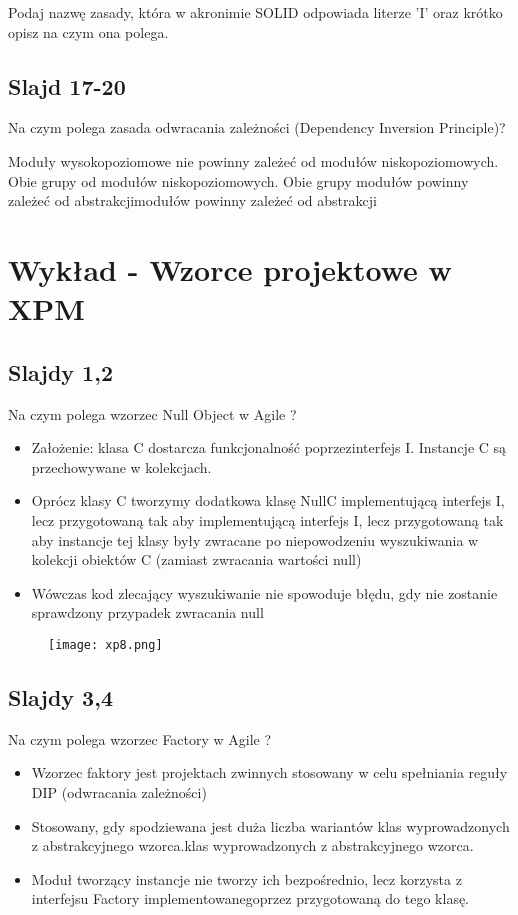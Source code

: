 \documentclass[a4paper,15pt]{article}
\newcommand{\question}[2]{
    \begin{tcolorbox}[colback=mRed!5!white,colframe=mRed,title={Kolokwium 2018 #1}]
        #2
    \end{tcolorbox}
}
\begin{document}
\question{}{
 Podaj nazwę zasady, która w akronimie SOLID odpowiada literze 'I' oraz krótko opisz na czym ona polega. 
}

\subsection{Slajd 17-20}
\begin{framed}
Na czym polega zasada odwracania zależności (Dependency Inversion Principle)?
\end{framed}
Moduły wysokopoziomowe nie powinny zależeć od modułów niskopoziomowych. Obie grupy od modułów niskopoziomowych. Obie grupy modułów powinny zależeć od abstrakcjimodułów powinny zależeć od abstrakcji

\section{Wykład - Wzorce projektowe w XPM}

\subsection{Slajdy 1,2}
\begin{framed}
Na czym polega wzorzec Null Object w Agile ?
\end{framed}
\begin{itemize}
\item Założenie: klasa C dostarcza funkcjonalność poprzezinterfejs I. Instancje C są przechowywane w kolekcjach.
\item Oprócz klasy C tworzymy dodatkowa klasę NullC implementującą interfejs I, lecz przygotowaną tak aby implementującą interfejs I, lecz przygotowaną tak aby instancje tej klasy były zwracane po niepowodzeniu wyszukiwania w kolekcji obiektów C (zamiast zwracania wartości null)
\item Wówczas kod zlecający wyszukiwanie nie spowoduje błędu, gdy nie zostanie sprawdzony przypadek zwracania null
\end{itemize}

\begin{figure}[H]
\centerline{\texttt{[image: xp8.png]}}
\end{figure}


\subsection{Slajdy 3,4}
\begin{framed}
Na czym polega wzorzec Factory w Agile ?
\end{framed}
\begin{itemize}
\item Wzorzec faktory jest projektach zwinnych stosowany w celu spełniania reguły DIP (odwracania zależności)
\item Stosowany, gdy spodziewana jest duża liczba wariantów klas wyprowadzonych z abstrakcyjnego wzorca.klas wyprowadzonych z abstrakcyjnego wzorca.
\item Moduł tworzący instancje nie tworzy ich bezpośrednio, lecz korzysta z interfejsu Factory implementowanegoprzez przygotowaną do tego klasę. 
\end{itemize}
\end{document}
